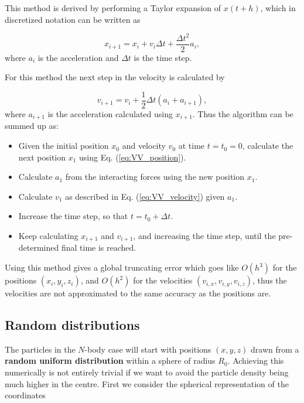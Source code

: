 \documentclass{article}
\begin{document}
\begin{multicols}{2}
This method is derived by performing a Taylor expansion of $x(t+h)$, which in discretized notation can be written as

\begin{equation}\label{eq:VV_position}
	x_{i+1} = x_i + v_i \Delta t + \frac{\Delta t^2}{2}a_i,
\end{equation}
where $a_i$ is the acceleration and $\Delta t$ is the time step.

For this method the next step in the velocity is calculated by

\begin{equation}\label{eq:VV_velocity}
	v_{i+1} = v_i + \frac{1}{2}\Delta t (a_i + a_{i+1}),
\end{equation}
where $a_{i+1}$ is the acceleration calculated using $x_{i+1}$. Thus the algorithm can be summed up as:

\begin{itemize}
	\item Given the initial position $x_0$ and velocity $v_0$ at time $t = t_0 = 0$, calculate the next position $x_1$ using Eq. (\ref{eq:VV_position}).
	\item Calculate $a_1$ from the interacting forces using the new position $x_1$.
	\item Calculate $v_1$ as described in Eq. (\ref{eq:VV_velocity}) given $a_1$.
	\item Increase the time step, so that $t = t_0 + \Delta t$. 
	\item Keep calculating $x_{i+1}$ and $v_{i+1}$, and increasing the time step, until the pre-determined final time is reached.
\end{itemize}
Using this method gives a global truncating error which goes like $O(h^3)$ for the positions $(x_i,y_i,z_i)$, and $O(h^2)$ for the velocities $(v_{i,x},v_{i,y},v_{i,z})$, thus the velocities are not approximated to the same accuracy as the positions are. 




\subsection{Random distributions}
The particles in the $N$-body case will start with positions $(x,y,z)$ drawn from a \textbf{random uniform distribution} within a sphere of radius $R_0$. Achieving this numerically is not entirely trivial if we want to avoid the particle density being much higher in the centre. First we consider the spherical representation of the coordinates


\end{multicols}
\end{document}
